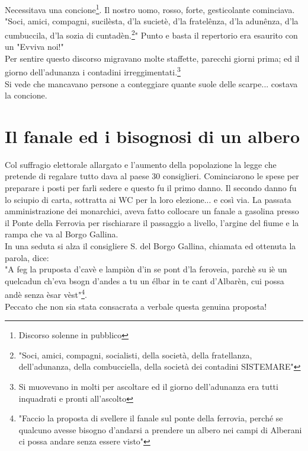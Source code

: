 \documentclass[10pt]{memoir} %
\begin{document}
Necessitava una concione\footnote{Discorso solenne in pubblico}. Il nostro uomo, rosso, forte, gesticolante cominciava.\\
"Soci, amici, compagni, sucilèsta, d'la sucietè, d'la fratelênza, d'la adunênza, d'la cumbuccila, d'la sozia di cuntadèn.\footnote{"Soci, amici, compagni, socialisti, della società, della fratellanza, dell'adunanza, della combucciella, della società dei contadini SISTEMARE"}" Punto e basta il repertorio era esaurito con un "Evviva noi!"\\
Per sentire questo discorso migravano molte staffette, parecchi giorni prima; ed il giorno  dell'adunanza i contadini irreggimentati.\footnote{Si muovevano in molti per ascoltare ed il giorno dell'adunanza era tutti inquadrati e pronti all'ascolto} \\
Si vede che mancavano persone a conteggiare quante suole delle scarpe... costava la concione.


\chapter{Il fanale ed i bisognosi di un albero}
Col suffragio elettorale allargato e l'aumento della popolazione la legge che pretende di regalare tutto dava al paese 30 consiglieri. Cominciarono le spese per preparare i posti per farli sedere e questo fu il primo danno. Il secondo danno fu lo sciupio di carta, sottratta ai WC per la loro elezione... e così via. La passata amministrazione dei monarchici, aveva fatto collocare un fanale a gasolina presso il Ponte della Ferrovia per rischiarare il passaggio a livello, l'argine del fiume e la rampa che va al Borgo Gallina.\\
In una seduta si alza il consigliere S.\: \: del Borgo Gallina, chiamata ed ottenuta la parola, dice:\\
"A feg la pruposta d'cavè e lampiòn d'in se pont d'la feroveia, parchè su iè un quelcadun ch'eva bsogn d'andes a tu un élbar in te cant d'Albarèn, cui possa andè senza èsar vèst"\footnote{"Faccio la proposta di svellere il fanale sul ponte della ferrovia, perché se qualcuno avesse bisogno d'andarsi a prendere un albero nei campi di Alberani ci possa andare senza essere visto"}.\\
Peccato che non sia stata consacrata a verbale questa genuina proposta!
\end{document}
